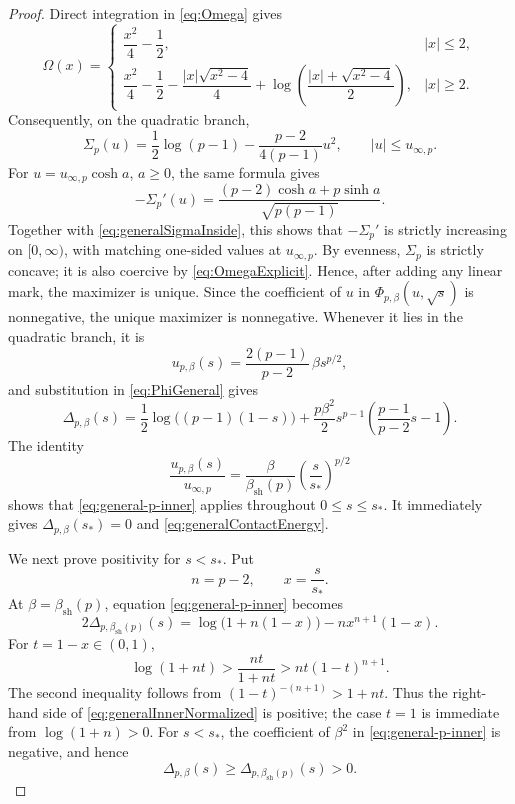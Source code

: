 \documentclass[11pt,reqno]{amsart}
\numberwithin{equation}{section}
\theoremstyle{plain}
\theoremstyle{definition}
\theoremstyle{remark}
\newcommand{\1}{\mathbf 1}
\newcommand{\Om}{\Omega}
\begin{document}
\begin{proof}
Direct integration in \eqref{eq:Omega} gives
\begin{equation}\label{eq:OmegaExplicit}
 \Om(x)=
 \begin{cases}
  \dfrac{x^2}{4}-\dfrac12, & |x|\leq2,\\[6pt]
  \dfrac{x^2}{4}-\dfrac12-
  \dfrac{|x|\sqrt{x^2-4}}{4}
  +\log\!\left(\dfrac{|x|+\sqrt{x^2-4}}2\right), & |x|\geq2.
 \end{cases}
\end{equation}
Consequently, on the quadratic branch,
\begin{equation}\label{eq:generalSigmaInside}
 \Sigma_p(u)
 =\frac12\log(p-1)-\frac{p-2}{4(p-1)}u^2,
 \qquad |u|\leq u_{\infty,p}.
\end{equation}
For \(u=u_{\infty,p}\cosh a\), \(a\geq0\), the same formula gives
\[
 -\Sigma_p'(u)
 =\frac{(p-2)\cosh a+p\sinh a}{\sqrt{p(p-1)}}.
\]
Together with \eqref{eq:generalSigmaInside}, this shows that
\(-\Sigma_p'\) is strictly increasing on \([0,\infty)\), with matching
one-sided values at \(u_{\infty,p}\).  By evenness, \(\Sigma_p\) is
strictly concave; it is also coercive by \eqref{eq:OmegaExplicit}.
Hence, after adding any linear mark, the maximizer is unique.
Since the coefficient of \(u\) in \(\Phi_{p,\beta}(u,\sqrt s)\) is
nonnegative, the unique maximizer is nonnegative.  Whenever it lies in
the quadratic branch, it is
\begin{equation}\label{eq:generalInnerOptimizer}
 u_{p,\beta}(s)
 =\frac{2(p-1)}{p-2}\,\beta s^{p/2},
\end{equation}
and substitution in \eqref{eq:PhiGeneral} gives
\begin{equation}\label{eq:general-p-inner}
 \Delta_{p,\beta}(s)
 =\frac12\log\bigl((p-1)(1-s)\bigr)
 +\frac{p\beta^2}{2}s^{p-1}
  \left(\frac{p-1}{p-2}s-1\right).
\end{equation}
The identity
\begin{equation}\label{eq:optimizerEdgeRatio}
 \frac{u_{p,\beta}(s)}{u_{\infty,p}}
 =\frac{\beta}{\beta_{\mathrm{sh}}(p)}
  \left(\frac{s}{s_*}\right)^{p/2}
\end{equation}
shows that \eqref{eq:general-p-inner} applies throughout
\(0\leq s\leq s_*\).  It immediately gives
\(\Delta_{p,\beta}(s_*)=0\) and \eqref{eq:generalContactEnergy}.

We next prove positivity for \(s<s_*\).  Put
\[
 n=p-2,
 \qquad
 x=\frac{s}{s_*}.
\]
At \(\beta=\beta_{\mathrm{sh}}(p)\), equation
\eqref{eq:general-p-inner} becomes
\begin{equation}\label{eq:generalInnerNormalized}
 2\Delta_{p,\beta_{\mathrm{sh}}(p)}(s)
 =\log\bigl(1+n(1-x)\bigr)-nx^{n+1}(1-x).
\end{equation}
For \(t=1-x\in(0,1)\),
\[
 \log(1+nt)>\frac{nt}{1+nt}>nt(1-t)^{n+1}.
\]
The second inequality follows from
\((1-t)^{-(n+1)}>1+nt\).  Thus the right-hand side of
\eqref{eq:generalInnerNormalized} is positive; the case \(t=1\) is
immediate from \(\log(1+n)>0\).  For \(s<s_*\), the
coefficient of \(\beta^2\) in \eqref{eq:general-p-inner} is negative,
and hence
\[
 \Delta_{p,\beta}(s)
 \geq\Delta_{p,\beta_{\mathrm{sh}}(p)}(s)>0.
\]


\end{proof}
\end{document}
